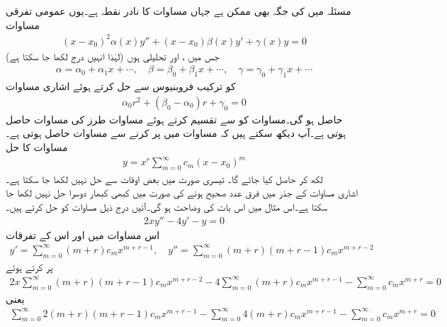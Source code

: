 مسئلہ  میں  کی جگہ  بھی ممکن ہے جہاں  مساوات کا نادر نقطہ ہے۔یوں عمومی تفرقی مساوات 
\begin{align}\label{مساوات_بیسل_عمومی_ترکیب_فروبنیوس}
(x-x_0)^2 \alpha(x) y'' +(x-x_0)\beta(x)y'+\gamma(x)y=0
\end{align}
جس میں  ،  اور  تحلیلی ہوں (لہٰذا انہیں درج لکھا جا سکتا ہے) 
\begin{align*}
\alpha=\alpha_0+\alpha_1x+\cdots,\quad \beta=\beta_0+\beta_1x+\cdots, \quad \gamma=\gamma_0+\gamma_1x+\cdots
\end{align*}
کو ترکیب فروبنیوس سے حل کرتے ہوئے اشاری مساوات
\begin{align}
\alpha_0 r^2+(\beta_0-\alpha_0)r+\gamma_0=0
\end{align}
حاصل ہو گی۔مساوات  کو  سے تقسیم کرتے ہوئے مساوات  طرز کی مساوات حاصل ہوتی ہے۔آپ دیکھ سکتے ہیں کہ مساوات  میں  پر کرنے سے  مساوات  حاصل ہوتی ہے۔مساوات  کا حل
\begin{align}
y=x^r\sum_{m=0}^{\infty} c_m (x-x_0)^m
\end{align}
لکھ کر حاصل کیا جائے گا۔
\quad تیسری صورت میں بعض اوقات  سے حل نہیں لکھا جا سکتا ہے۔\\
اشاری مساوات کے جذر میں فرق عدد صحیح ہونے کی صورت میں کبھی کبھار دوسرا حل  نہیں لکھا جا سکتا ہے۔اس مثال میں اس بات کی وضاحت ہو گی۔آئیں درج ذیل مساوات کو حل کرتے ہیں۔
\begin{align*}
2xy''-4y'-y=0
\end{align*}
اس مساوات میں  اور اس کے تفرقات
\begin{align*}
y'=\sum_{m=0}^{\infty} (m+r)c_mx^{m+r-1},\quad y''=\sum_{m=0}^{\infty} (m+r)(m+r-1)c_mx^{m+r-2}
\end{align*}
پر کرتے ہوئے
\begin{align*}
2x\sum_{m=0}^{\infty} (m+r)(m+r-1)c_mx^{m+r-2}-4\sum_{m=0}^{\infty}(m+r)c_mx^{m+r-1}-\sum_{m=0}^{\infty}c_mx^{m+r}=0
\end{align*}
یعنی
\begin{align*}
\sum_{m=0}^{\infty}2 (m+r)(m+r-1)c_mx^{m+r-1}-\sum_{m=0}^{\infty}4(m+r)c_mx^{m+r-1}-\sum_{m=0}^{\infty}c_mx^{m+r}=0
\end{align*}
